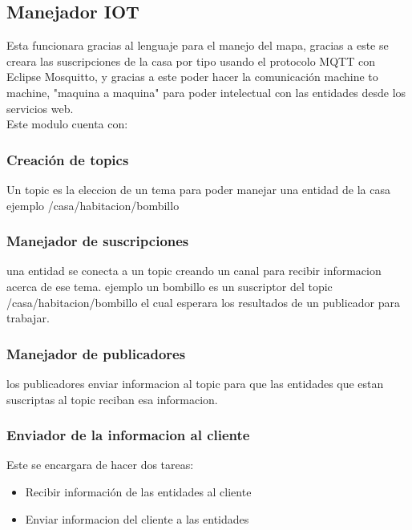 \subsection{Manejador IOT}
Esta funcionara gracias al lenguaje para el manejo del mapa, gracias a este se creara las suscripciones de la casa por tipo usando el protocolo MQTT con Eclipse Mosquitto, y gracias a este poder hacer la comunicación machine to machine, "maquina a maquina" para poder intelectual con las entidades desde los servicios web.\\
Este modulo cuenta con:
\subsubsection{Creación de topics}
Un topic es la eleccion de un tema para poder manejar una entidad de la casa ejemplo /casa/habitacion/bombillo
\subsubsection{Manejador de suscripciones}
una entidad se conecta a un topic creando un canal para recibir informacion acerca de ese tema.
ejemplo un bombillo es un suscriptor del topic /casa/habitacion/bombillo el cual esperara los resultados de un publicador para trabajar.
\subsubsection{Manejador de publicadores}
los publicadores enviar informacion al topic para que las entidades que estan suscriptas al topic reciban esa informacion.
\subsubsection{Enviador de la informacion al cliente}
Este se encargara de hacer dos tareas:\\
\begin{itemize}
\item Recibir información de las entidades al cliente
\item Enviar informacion del cliente a las entidades
\end{itemize}
